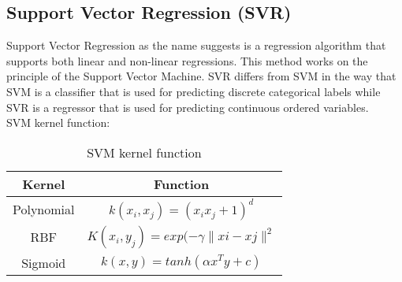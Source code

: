 \documentclass{ieeeojies}
\begin{document}
\subsection{Support Vector Regression (SVR) }
Support Vector Regression as the name suggests is a regression algorithm that supports both linear and non-linear regressions. This method works on the principle of the Support Vector Machine. SVR differs from SVM in the way that SVM is a classifier that is used for predicting discrete categorical labels while SVR is a regressor that is used for predicting continuous ordered variables.
\\SVM kernel function:
\begin{table}[ht]
  \centering
  \caption{SVM kernel function}
\begin{tabular}{|c|c|}
    \hline
     Kernel & Function \\ \hline
     Polynomial & \(k\left(x_i,x_j\right)=\left(x_ix_j+1\right)^d\) \\ \hline
     RBF & \(K\left(x_i,y_j\right)=exp(-\gamma\|xi-xj\|^2\) \\ \hline
     Sigmoid & \(k\left(x,y\right)=tanh{\left(\alpha x^Ty+c\right)}\)\\ \hline
\end{tabular}
\end{table}
\end{document}

